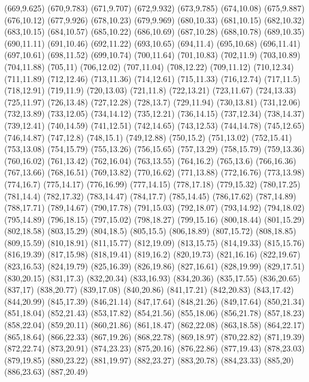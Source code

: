 (669,9.625)
(670,9.783)
(671,9.707)
(672,9.932)
(673,9.785)
(674,10.08)
(675,9.887)
(676,10.12)
(677,9.926)
(678,10.23)
(679,9.969)
(680,10.33)
(681,10.15)
(682,10.32)
(683,10.15)
(684,10.57)
(685,10.22)
(686,10.69)
(687,10.28)
(688,10.78)
(689,10.35)
(690,11.11)
(691,10.46)
(692,11.22)
(693,10.65)
(694,11.4)
(695,10.68)
(696,11.41)
(697,10.61)
(698,11.52)
(699,10.74)
(700,11.64)
(701,10.83)
(702,11.9)
(703,10.89)
(704,11.88)
(705,11)
(706,12.02)
(707,11.04)
(708,12.22)
(709,11.12)
(710,12.34)
(711,11.89)
(712,12.46)
(713,11.36)
(714,12.61)
(715,11.33)
(716,12.74)
(717,11.5)
(718,12.91)
(719,11.9)
(720,13.03)
(721,11.8)
(722,13.21)
(723,11.67)
(724,13.33)
(725,11.97)
(726,13.48)
(727,12.28)
(728,13.7)
(729,11.94)
(730,13.81)
(731,12.06)
(732,13.89)
(733,12.05)
(734,14.12)
(735,12.21)
(736,14.15)
(737,12.34)
(738,14.37)
(739,12.41)
(740,14.59)
(741,12.51)
(742,14.65)
(743,12.53)
(744,14.78)
(745,12.65)
(746,14.87)
(747,12.8)
(748,15.1)
(749,12.88)
(750,15.2)
(751,13.02)
(752,15.41)
(753,13.08)
(754,15.79)
(755,13.26)
(756,15.65)
(757,13.29)
(758,15.79)
(759,13.36)
(760,16.02)
(761,13.42)
(762,16.04)
(763,13.55)
(764,16.2)
(765,13.6)
(766,16.36)
(767,13.66)
(768,16.51)
(769,13.82)
(770,16.62)
(771,13.88)
(772,16.76)
(773,13.98)
(774,16.7)
(775,14.17)
(776,16.99)
(777,14.15)
(778,17.18)
(779,15.32)
(780,17.25)
(781,14.4)
(782,17.32)
(783,14.47)
(784,17.7)
(785,14.45)
(786,17.62)
(787,14.89)
(788,17.71)
(789,14.67)
(790,17.78)
(791,15.03)
(792,18.07)
(793,14.92)
(794,18.02)
(795,14.89)
(796,18.15)
(797,15.02)
(798,18.27)
(799,15.16)
(800,18.44)
(801,15.29)
(802,18.58)
(803,15.29)
(804,18.5)
(805,15.5)
(806,18.89)
(807,15.72)
(808,18.85)
(809,15.59)
(810,18.91)
(811,15.77)
(812,19.09)
(813,15.75)
(814,19.33)
(815,15.76)
(816,19.39)
(817,15.98)
(818,19.41)
(819,16.2)
(820,19.73)
(821,16.16)
(822,19.67)
(823,16.53)
(824,19.79)
(825,16.39)
(826,19.86)
(827,16.61)
(828,19.99)
(829,17.51)
(830,20.15)
(831,17.3)
(832,20.34)
(833,16.93)
(834,20.36)
(835,17.55)
(836,20.65)
(837,17)
(838,20.77)
(839,17.08)
(840,20.86)
(841,17.21)
(842,20.83)
(843,17.42)
(844,20.99)
(845,17.39)
(846,21.14)
(847,17.64)
(848,21.26)
(849,17.64)
(850,21.34)
(851,18.04)
(852,21.43)
(853,17.82)
(854,21.56)
(855,18.06)
(856,21.78)
(857,18.23)
(858,22.04)
(859,20.11)
(860,21.86)
(861,18.47)
(862,22.08)
(863,18.58)
(864,22.17)
(865,18.64)
(866,22.33)
(867,19.26)
(868,22.78)
(869,18.97)
(870,22.82)
(871,19.39)
(872,22.74)
(873,20.91)
(874,23.23)
(875,20.16)
(876,22.86)
(877,19.43)
(878,23.03)
(879,19.85)
(880,23.22)
(881,19.97)
(882,23.27)
(883,20.78)
(884,23.33)
(885,20)
(886,23.63)
(887,20.49)

